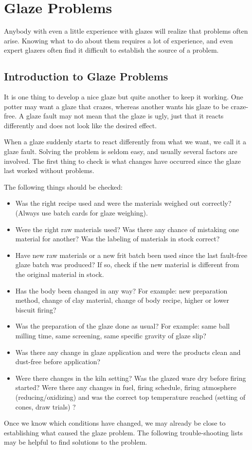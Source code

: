 \chapter{Glaze Problems}
Anybody with even a little experience with glazes will realize that problems 
often arise. Knowing what to do about them requires a lot of experience, and 
even expert glazers often find it difficult to establish the source of a 
problem.
\section{Introduction to Glaze Problems}
It is one thing to develop a nice glaze but quite another to keep it working. 
One potter may want a glaze that crazes, whereas another wants his glaze to be 
craze-free. A glaze fault may not mean that the glaze is ugly, just that it 
reacts differently and does not look like the desired effect.

When a glaze suddenly starts to react differently from what we want, we call it 
a glaze fault. Solving the problem is seldom easy, and usually several factors 
are involved. The first thing to check is what changes have occurred since the 
glaze last worked without problems. 

The following things should be checked:
\begin{itemize}
\item Was the right recipe used and were the materials weighed out correctly? 
(Always use batch cards for glaze weighing).
\item Were the right raw materials used? Was there any chance of mistaking one 
material for another? Was the labeling of materials in stock correct?
\item Have new raw materials or a new frit batch been used since the last 
fault-free glaze batch was produced? If so, check if the new material is 
different from the original material in stock.
\item Has the body been changed in any way? For example: new preparation 
method, change of clay material, change of body recipe, higher or lower biscuit 
firing?
\item Was the preparation of the glaze done as usual? For example: same ball 
milling time, same screening, same specific gravity of glaze slip?
\item Was there any change in glaze application and were the products clean and 
dust-free before application?
\item Were there changes in the kiln setting? Was the glazed ware dry before 
firing started? Were there any changes in fuel, firing schedule, firing 
atmosphere (reducing/oxidizing) and was the correct top temperature reached 
(setting of cones, draw trials) ?
\end{itemize}
Once we know which conditions have changed, we may already be close to 
establishing what caused the glaze problem. The following trouble-shooting 
lists may be helpful to find solutions to the problem.
